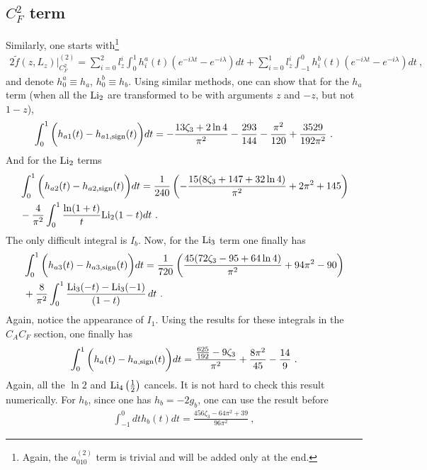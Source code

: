 \documentclass[a4paper,11pt]{article}
\begin{document}
\subsection{$C_F^2$ term}
Similarly, one starts with\footnote{Again, the $a_{010}^{(2)}$ term is trivial and will be added only at the end.}
\begin{align}
2\tilde f(z,L_z)|_{C_F^2}^{(2)}=\sum_{i=0}^2l_z^i\int_{0}^1 h_i^a(t)\left(e^{-i\lambda t}-e^{-i\lambda}\right)dt+\sum_{i=0}^1l_z^i\int_{-1}^0 h_i^b(t)\left(e^{-i\lambda t}-e^{-i\lambda}\right)dt \ ,
\end{align}
and denote $h_{0}^a\equiv h_a$, $h_{0}^b \equiv h_b$. Using similar methods, one can show that for the $h_a$ term (when all the ${\rm Li}_2$ are transformed to be with arguments $z$ and $-z$, but not $1-z$),
\begin{align}
\int_{0}^1 \bigg(h_{a1}(t)-h_{a1,{\rm sign}}(t)\bigg) dt=-\frac{13 \zeta_3+2 \ln 4}{\pi ^2}-\frac{293}{144}-\frac{\pi ^2}{120}+\frac{3529}{192 \pi ^2} \ .
\end{align}
And for the ${\rm Li}_2$ terms
\begin{align}
&\int_{0}^1 \bigg(h_{a2}(t)-h_{a2,{\rm sign}}(t)\bigg) dt=\frac{1}{240} \left(-\frac{15 (8 \zeta_3+147+32 \ln 4)}{\pi ^2}+2 \pi ^2+145\right) \nonumber \\ 
&-\frac{4}{\pi^2}\int_{0}^1 \frac{\ln(1+t)}{t}{\rm Li}_2(1-t) dt \ .
\end{align}
The only difficult integral is $I_b$. Now, for the ${\rm Li}_3$ term one finally has
\begin{align}
&\int_{0}^1 \bigg(h_{a3}(t)-h_{a3,{\rm sign}}(t)\bigg) dt=\frac{1}{720} \left(\frac{45 (72 \zeta_3-95+64 \ln 4)}{\pi ^2}+94 \pi ^2-90\right) \nonumber \\ 
&+\frac{8}{\pi^2}\int_0^1 \frac{\text{Li}_3(-t)-\text{Li}_3(-1)}{(1-t)} \, dt \ .
\end{align}
Again, notice the appearance of $I_1$. Using the results for these integrals in the $C_AC_F$ section, one finally has
\begin{align}
\int_{0}^1 \bigg(h_{a}(t)-h_{a,{\rm sign}}(t)\bigg) dt=\frac{\frac{625}{192}-9 \zeta_3}{\pi ^2}+\frac{8 \pi ^2}{45}-\frac{14}{9} \ .
\end{align}
Again, all the $\ln 2$ and ${\rm Li}_4 \left(\frac{1}{2}\right)$ cancels. It is not hard to check this result numerically. For $h_{b}$, since one has $h_{b}=-2g_b$, one can use the result before
\begin{align}
\int_{-1}^0 dt h_b(t) dt=\frac{456 \zeta_3-64 \pi ^2+39}{96 \pi ^2} \ ,
\end{align}
\end{document}
